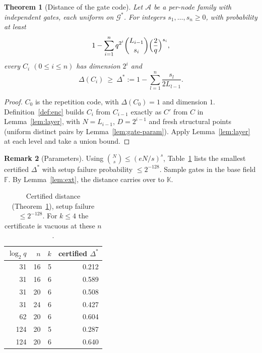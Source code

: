 \documentclass[11pt]{article}
\newtheorem{theorem}{Theorem}[section]
\theoremstyle{definition}
\newtheorem{remark}[theorem]{Remark}
\newcommand{\F}{\mathbb{F}}
\newcommand{\K}{\mathbb{K}}
\newcommand{\Gs}{\mathcal{G}^{*}}
\begin{document}
\begin{theorem}[Distance of the gate code]\label{thm:distance}
Let $\mathcal{A}$ be a per-node family with independent gates, each uniform on $\Gs$. For integers
$s_1,\dots,s_n\ge0$, with probability at least
\[
1-\sum_{i=1}^{n}q^{2^{i}}\binom{L_{i-1}}{s_i}\Bigl(\frac{2}{q}\Bigr)^{s_i},
\]
every $C_i$ $(0\le i\le n)$ has dimension $2^i$ and
\[
\Delta(C_i)\ \ge\ \Delta^{*}:=1-\sum_{l=1}^{n}\frac{s_l}{2L_{l-1}}.
\]
\end{theorem}
\begin{proof}
$C_0$ is the repetition code, with $\Delta(C_0)=1$ and dimension $1$. Definition~\ref{def:enc}
builds $C_i$ from $C_{i-1}$ exactly as $C'$ from $C$ in Lemma~\ref{lem:layer}, with
$N=L_{i-1}$, $D=2^{i-1}$ and fresh structural points (uniform distinct pairs by
Lemma~\ref{lem:gate-param}). Apply Lemma~\ref{lem:layer} at each level and take a union bound.
\end{proof}

\begin{remark}[Parameters]
Using $\binom{N}{s}\le(eN/s)^s$, Table~\ref{tab:bound} lists the smallest certified $\Delta^{*}$
with setup failure probability $\le2^{-128}$. Sample gates in the base field $\F$. By
Lemma~\ref{lem:ext}, the distance carries over to $\K$.
\end{remark}

\begin{table}[h]
\centering
\begin{tabular}{rrrr}
\toprule
$\log_2q$ & $n$ & $k$ & certified $\Delta^{*}$\\
\midrule
31 & 16 & 5 & 0.212\\
31 & 16 & 6 & 0.589\\
31 & 20 & 6 & 0.508\\
31 & 24 & 6 & 0.427\\
62 & 20 & 6 & 0.604\\
124 & 20 & 5 & 0.287\\
124 & 20 & 6 & 0.640\\
\bottomrule
\end{tabular}
\caption{Certified distance (Theorem~\ref{thm:distance}), setup failure $\le 2^{-128}$.
For $k\le4$ the certificate is vacuous at these $n$.}\label{tab:bound}
\end{table}
\end{document}
